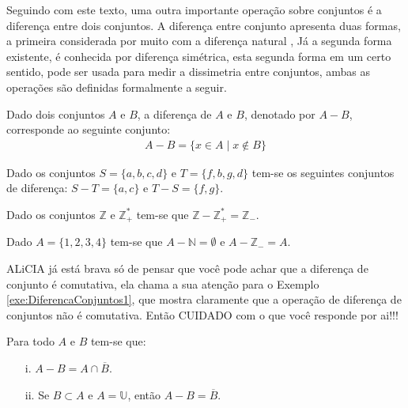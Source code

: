 Seguindo com este texto, uma outra importante operação sobre conjuntos é a diferença entre dois conjuntos. A diferença entre conjunto apresenta duas formas, a primeira considerada por muito com a diferença natural \cite{carmo2013}, Já a segunda forma existente, é conhecida por diferença simétrica, esta segunda forma em um certo sentido, pode ser usada para medir a  dissimetria entre conjuntos, ambas as operações são definidas formalmente a seguir.

\begin{definicao}\label{def:DiferencaConjuntos}
	Dado dois conjuntos $A$ e $B$, a diferença de $A$ e $B$, denotado por $A - B$, corresponde ao seguinte conjunto:
  \begin{eqnarray*}
    A - B = \{x \in A \mid x \notin B\}
  \end{eqnarray*}
\end{definicao}

\begin{exemplo}\label{exe:DiferencaConjuntos1}
	Dado os conjuntos $S = \{a, b, c, d\}$ e $T = \{f, b, g, d\}$ tem-se os seguintes conjuntos de diferença: $S - T = \{a, c\}$ e $T - S = \{f, g\}$.
\end{exemplo}

\begin{exemplo}\label{exe:DiferencaConjuntos2}
	Dado os conjuntos $\mathbb{Z}$ e $\mathbb{Z}_+^*$ tem-se que $\mathbb{Z} - \mathbb{Z}_+^* = \mathbb{Z}_-$.
\end{exemplo}

\begin{exemplo}\label{exe:DiferencaConjuntos3}
  Dado $A = \{1, 2, 3, 4\}$ tem-se que $A - \mathbb{N} = \emptyset$ e $A - \mathbb{Z}_{-} = A$. 
\end{exemplo}

\begin{cuidado}\label{warn:NaoComutatividadeDiferenca}
  ALiCIA já está brava só de pensar que você pode achar que a diferença de conjunto é comutativa, ela chama a sua atenção para o Exemplo \ref{exe:DiferencaConjuntos1}, que mostra claramente que a operação de diferença de conjuntos não é comutativa. Então {\color{red}CUIDADO} com o que você responde por ai!!!
\end{cuidado}

\begin{teorema}\label{teo:BasicoDiferencaConjuntos}
	Para todo $A$ e $B$ tem-se que:
	\begin{itemize}
		\item[i.] $A - B = A \cap \overline{B}$.
		\item[ii.] Se $B \subset A$  e $A = \mathbb{U}$, então $A - B = \overline{B}$.
	\end{itemize}
\end{teorema}

